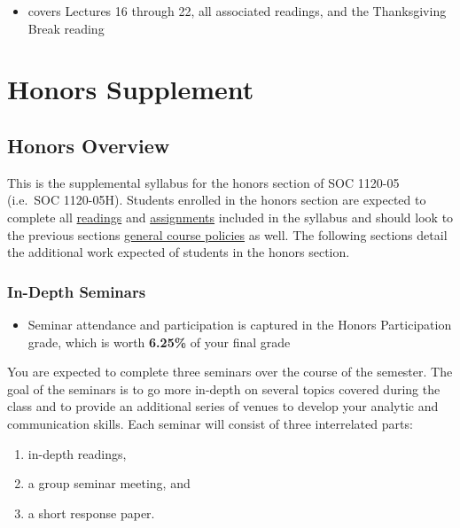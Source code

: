 \documentclass[]{book}
\providecommand{\tightlist}{%
  \setlength{\itemsep}{0pt}\setlength{\parskip}{0pt}}
\newenvironment{rmdblock}[1]
  {\begin{shaded*}
  \begin{itemize}
  \renewcommand{\labelitemi}{
    \raisebox{-.7\height}[0pt][0pt]{
      {\setkeys{Gin}{width=3em,keepaspectratio}\texttt{[image: images/\#1]}}
    }
  }
  \item
  }
  {
  \end{itemize}
  \end{shaded*}
  }
\newenvironment{rmdtip}
  {\begin{rmdblock}{tip}}
  {\end{rmdblock}}
\begin{document}
\begin{itemize}
\tightlist
\item
  covers Lectures 16 through 22, all associated readings, and the Thanksgiving Break reading
\end{itemize}

\hypertarget{part-honors-supplement}{%
\part{Honors Supplement}\label{part-honors-supplement}}

\hypertarget{honors-overview}{%
\chapter{Honors Overview}\label{honors-overview}}

This is the supplemental syllabus for the honors section of SOC 1120-05 (i.e.~SOC 1120-05H). Students enrolled in the honors section are expected to complete all \href{/lecture-schedule.html}{readings} and \href{/assignments-and-grading.html}{assignments} included in the syllabus and should look to the previous sections \href{/course-policies.html}{general course policies} as well. The following sections detail the additional work expected of students in the honors section.

\hypertarget{in-depth-seminars}{%
\section{In-Depth Seminars}\label{in-depth-seminars}}

\begin{rmdtip}
Seminar attendance and participation is captured in the Honors
Participation grade, which is worth \textbf{6.25\%} of your final grade
\end{rmdtip}

You are expected to complete three seminars over the course of the semester. The goal of the seminars is to go more in-depth on several topics covered during the class and to provide an additional series of venues to develop your analytic and communication skills. Each seminar will consist of three interrelated parts:

\begin{enumerate}
\def\labelenumi{\arabic{enumi}.}
\tightlist
\item
  in-depth readings,
\item
  a group seminar meeting, and
\item
  a short response paper.
\end{enumerate}
\end{document}
